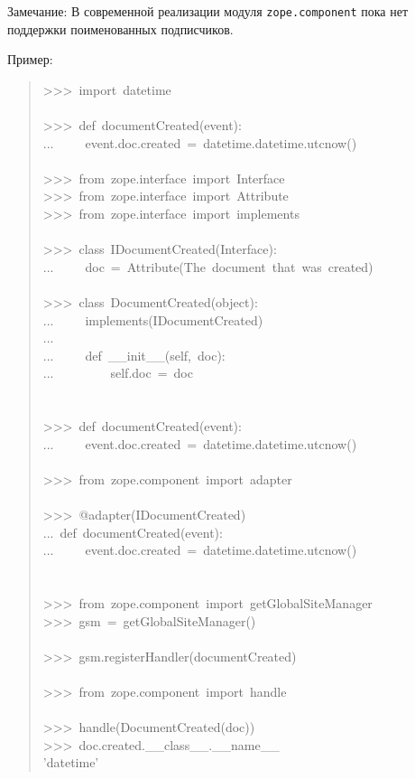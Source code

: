 \documentclass[14pt,a4paper,openany,twoside,final]{extbook}
\begin{document}
Замечание: В современной реализации модуля \texttt{zope.component} пока нет
поддержки поименованных подписчиков.

Пример:

\begin{quote}{\ttfamily \raggedright \noindent
>{}>{}>~import~datetime\\
~\\
>{}>{}>~def~documentCreated(event):\\
...~~~~~event.doc.created~=~datetime.datetime.utcnow()\\
~\\
>{}>{}>~from~zope.interface~import~Interface\\
>{}>{}>~from~zope.interface~import~Attribute\\
>{}>{}>~from~zope.interface~import~implements\\
~\\
>{}>{}>~class~IDocumentCreated(Interface):\\
...~~~~~doc~=~Attribute(\textquotedbl{}The~document~that~was~created\textquotedbl{})\\
~\\
>{}>{}>~class~DocumentCreated(object):\\
...~~~~~implements(IDocumentCreated)\\
...\\
...~~~~~def~\_\_init\_\_(self,~doc):\\
...~~~~~~~~~self.doc~=~doc\\
~\\
~\\
>{}>{}>~def~documentCreated(event):\\
...~~~~~event.doc.created~=~datetime.datetime.utcnow()\\
~\\
>{}>{}>~from~zope.component~import~adapter\\
~\\
>{}>{}>~@adapter(IDocumentCreated)\\
...~def~documentCreated(event):\\
...~~~~~event.doc.created~=~datetime.datetime.utcnow()\\
~\\
~\\
>{}>{}>~from~zope.component~import~getGlobalSiteManager\\
>{}>{}>~gsm~=~getGlobalSiteManager()\\
~\\
>{}>{}>~gsm.registerHandler(documentCreated)\\
~\\
>{}>{}>~from~zope.component~import~handle\\
~\\
>{}>{}>~handle(DocumentCreated(doc))\\
>{}>{}>~doc.created.\_\_class\_\_.\_\_name\_\_\\
'datetime'
}
\end{quote}
\end{document}
